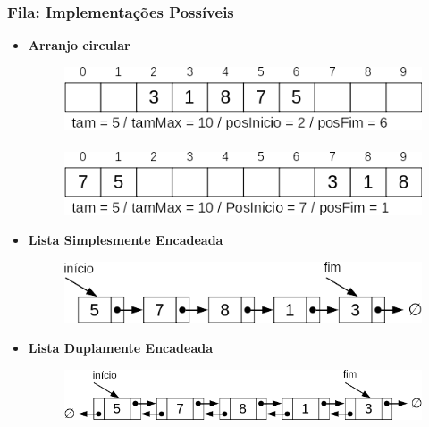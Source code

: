 \documentclass[aspectratio=169]{beamer}
\begin{document}
\begin{frame}\frametitle{Fila: Implementações Possíveis}
\begin{itemize}
	\item \textbf{Arranjo circular}
\begin{figure}[h]
	\flushleft
	\includegraphics[height=0.13\paperheight]{imagens/fila1a.png} ~ ~ ~ \includegraphics[height=0.13\paperheight]{imagens/fila1b.png}
\end{figure}
	\item \textbf{Lista Simplesmente Encadeada}
\begin{figure}[h]
	\flushleft
	\includegraphics[height=0.15\paperheight]{imagens/fila2.png}
\end{figure}
	\item \textbf{Lista Duplamente Encadeada}
\begin{figure}[h]
	\flushleft
	\includegraphics[height=0.15\paperheight]{imagens/fila3.png}
\end{figure}
\end{itemize}
\end{frame}
\end{document}
